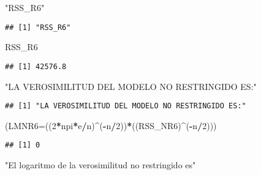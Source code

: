 \documentclass[
]{article}
\newenvironment{Shaded}{\begin{snugshade}}{\end{snugshade}}
\newcommand{\DataTypeTok}[1]{\textcolor[rgb]{0.13,0.29,0.53}{#1}}
\newcommand{\DecValTok}[1]{\textcolor[rgb]{0.00,0.00,0.81}{#1}}
\newcommand{\NormalTok}[1]{#1}
\newcommand{\OperatorTok}[1]{\textcolor[rgb]{0.81,0.36,0.00}{\textbf{#1}}}
\newcommand{\StringTok}[1]{\textcolor[rgb]{0.31,0.60,0.02}{#1}}
\begin{document}
\begin{Shaded}
\begin{Highlighting}[]
\StringTok{"RSS_R6"}
\end{Highlighting}
\end{Shaded}

\begin{verbatim}
## [1] "RSS_R6"
\end{verbatim}

\begin{Shaded}
\begin{Highlighting}[]
\NormalTok{RSS_R6}
\end{Highlighting}
\end{Shaded}

\begin{verbatim}
## [1] 42576.8
\end{verbatim}

\begin{Shaded}
\begin{Highlighting}[]
\StringTok{"LA VEROSIMILITUD DEL MODELO NO RESTRINGIDO ES:"}
\end{Highlighting}
\end{Shaded}

\begin{verbatim}
## [1] "LA VEROSIMILITUD DEL MODELO NO RESTRINGIDO ES:"
\end{verbatim}

\begin{Shaded}
\begin{Highlighting}[]
\NormalTok{(}\DataTypeTok{LMNR6=}\NormalTok{((}\DecValTok{2}\OperatorTok{*}\NormalTok{npi}\OperatorTok{*}\NormalTok{e}\OperatorTok{/}\NormalTok{n)}\OperatorTok{^}\NormalTok{(}\OperatorTok{-}\NormalTok{n}\OperatorTok{/}\DecValTok{2}\NormalTok{))}\OperatorTok{*}\NormalTok{((RSS_NR6)}\OperatorTok{^}\NormalTok{(}\OperatorTok{-}\NormalTok{n}\OperatorTok{/}\DecValTok{2}\NormalTok{)))}
\end{Highlighting}
\end{Shaded}

\begin{verbatim}
## [1] 0
\end{verbatim}

\begin{Shaded}
\begin{Highlighting}[]
\StringTok{"El logaritmo de la verosimilitud no restringido es"}
\end{Highlighting}
\end{Shaded}
\end{document}
